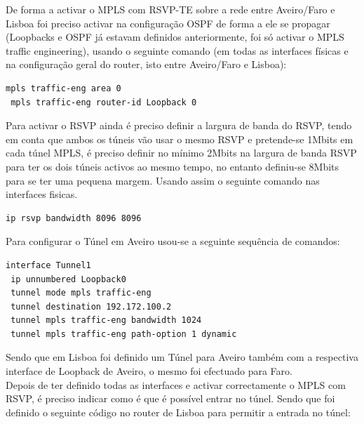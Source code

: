 \documentclass[11pt,a4paper]{report}
\begin{document}
De forma a activar o MPLS com RSVP-TE sobre a rede entre Aveiro/Faro e Lisboa foi preciso activar na configuração OSPF de forma a ele se propagar (Loopbacks e OSPF já estavam definidos anteriormente, foi só activar o MPLS traffic engineering), usando o seguinte comando (em todas as interfaces físicas e na configuração geral do router, isto entre Aveiro/Faro e Lisboa):\\

\begin{lstlisting}[caption=MPLS Tunnel - Activar MPLS TE no OSPF]
 mpls traffic-eng area 0
 mpls traffic-eng router-id Loopback 0
\end{lstlisting}

Para activar o RSVP ainda é preciso definir a largura de banda do RSVP, tendo em conta que ambos os túneis vão usar o mesmo RSVP e pretende-se 1Mbits em cada túnel MPLS, é preciso definir no mínimo 2Mbits na largura de banda RSVP para ter os dois túneis activos ao mesmo tempo, no entanto definiu-se 8Mbits para se ter uma pequena margem. Usando assim o seguinte comando nas interfaces fisicas.\\

\begin{lstlisting}[caption=MPLS Tunnel - Activar RSVP]
ip rsvp bandwidth 8096 8096
\end{lstlisting}

Para configurar o Túnel em Aveiro usou-se a seguinte sequência de comandos:\\
\begin{lstlisting}[caption=MPLS Tunnel - Aveiro]
interface Tunnel1
 ip unnumbered Loopback0
 tunnel mode mpls traffic-eng
 tunnel destination 192.172.100.2
 tunnel mpls traffic-eng bandwidth 1024
 tunnel mpls traffic-eng path-option 1 dynamic
\end{lstlisting}

Sendo que em Lisboa foi definido um Túnel para Aveiro também com a respectiva interface de Loopback de Aveiro, o mesmo foi efectuado para Faro.\\

Depois de ter definido todas as interfaces e activar correctamente o MPLS com RSVP, é preciso indicar como é que é possível entrar no túnel. Sendo que foi definido o seguinte código no router de Lisboa para permitir a entrada no túnel:\\
\end{document}

